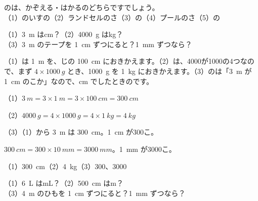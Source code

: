 \begin{jibun}
のは、かぞえる・はかるのどちらですでしょう。\\
\mbox{（1）のいすの}\quad \mbox{（2）ランドセルのさ}\quad \mbox{（3）の}\quad \mbox{（4）プールのさ}\quad \mbox{（5）の}
\end{jibun}

\begin{reidai}[\R{単位}{たん|い}をかえる]
（1）\qty{3}{m} はcm？\quad（2）\qty{4000}{g} はkg？\\
（3）\qty{3}{m} のテープを \qty{1}{cm} ずつにると？\quad \qty{1}{mm} ずつなら？\par
\kangaekata （1）は \qty{1}{m} を、じの \qty{100}{cm} におきかえます。（2）は、4000が1000の4つなので、まず $4\times\qty{1000}{g}$ とき、\qty{1000}{g} を \qty{1}{kg} におきかえます。（3）のは「\qty{3}{m} が \qty{1}{cm} のこか」なので、cm でしたときのです。\par
\shiki （1）$\qty{3}{m}=3\times\qty{1}{m}=3\times\qty{100}{cm}=\qty{300}{cm}$\par
\hspace*{2.6\zw}（2）$\qty{4000}{g}=4\times\qty{1000}{g}=4\times\qty{1}{kg}=\qty{4}{kg}$\par
\hspace*{2.6\zw}（3）（1）から \qty{3}{m} は \qty{300}{cm}。\qty{1}{cm} が300こ。\par
\hspace*{4.6\zw}$\qty{300}{cm}=300\times\qty{10}{mm}=\qty{3000}{mm}$。\qty{1}{mm} が3000こ。\par
\kotae （1）\qty{300}{cm}\quad（2）\qty{4}{kg}\quad（3）300、3000
\end{reidai}

\begin{jibun}
（1）\qty{6}{L} はmL？\quad（2）\qty{500}{cm} はm？\\
（3）\qty{4}{m} のひもを \qty{1}{cm} ずつにると？\quad \qty{1}{mm} ずつなら？
\end{jibun}

